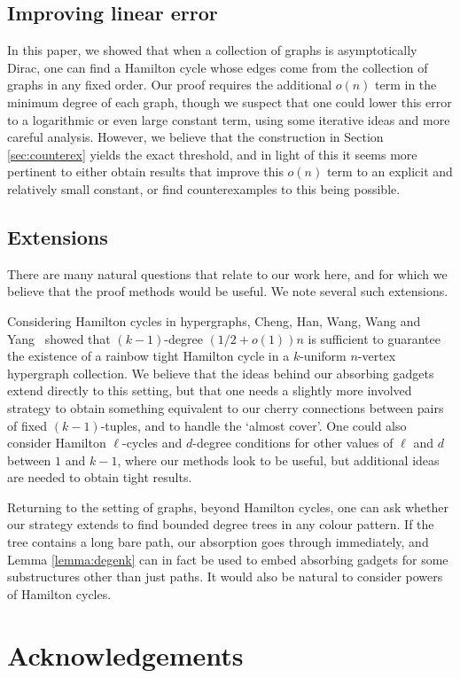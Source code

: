 \documentclass[11pt, dvipsnames]{amsart}
\theoremstyle{plain}
\theoremstyle{definition}
\begin{document}
\subsection{Improving linear error}
In this paper, we showed that when a collection of graphs is asymptotically Dirac, one can find a Hamilton cycle whose edges come from the collection of graphs in any fixed order. Our proof requires the additional $o(n)$ term in the minimum degree of each graph, though we suspect that one could lower this error to a logarithmic or even large constant term, using some iterative ideas and more careful analysis. However, we believe that the construction in Section \ref{sec:counterex} yields the exact threshold, and in light of this it seems more pertinent to either obtain results that improve this $o(n)$ term to an explicit and relatively small constant, or find counterexamples to this being possible.

\subsection{Extensions}
There are many natural questions that relate to our work here, and for which we believe that the proof methods would be useful. We note several such extensions.

Considering Hamilton cycles in hypergraphs, Cheng, Han, Wang, Wang and Yang~\cite{chwwy} showed that $(k-1)$-degree $(1/2+o(1))n$ is sufficient to guarantee the existence of a rainbow tight Hamilton cycle in a $k$-uniform $n$-vertex hypergraph collection. We believe that the ideas behind our absorbing gadgets extend directly to this setting, but that one needs a slightly more involved strategy to obtain something equivalent to our cherry connections between pairs of fixed $(k-1)$-tuples, and to handle the `almost cover'. One could also consider Hamilton $\ell$-cycles and $d$-degree conditions for other values of $\ell$ and $d$ between $1$ and $k-1$, where our methods look to be useful, but additional ideas are needed to obtain tight results. 

Returning to the setting of graphs, beyond Hamilton cycles, one can ask whether our strategy extends to find bounded degree trees in any colour pattern. If the tree contains a long bare path, our absorption goes through immediately, and Lemma \ref{lemma:degenk} can in fact be used to embed absorbing gadgets for some substructures other than just paths. It would also be natural to consider powers of Hamilton cycles.

\section{Acknowledgements}
\end{document}

